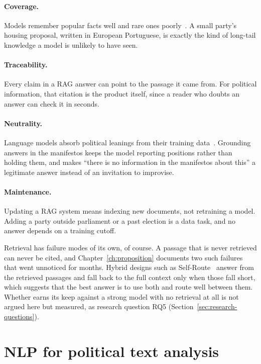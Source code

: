 \paragraph{Coverage.} Models remember popular facts well and rare ones poorly~\citep{kandpal2023largelanguagemodelsstruggle}. A small party's housing proposal, written in European Portuguese, is exactly the kind of long-tail knowledge a model is unlikely to have seen.

\paragraph{Traceability.} Every claim in a RAG answer can point to the passage it came from. For political information, that citation is the product itself, since a reader who doubts an answer can check it in seconds.

\paragraph{Neutrality.} Language models absorb political leanings from their training data~\citep{pretraining-political-bias}. Grounding answers in the manifestos keeps the model reporting positions rather than holding them, and makes ``there is no information in the manifestos about this'' a legitimate answer instead of an invitation to improvise.

\paragraph{Maintenance.} Updating a RAG system means indexing new documents, not retraining a model. Adding a party outside parliament or a past election is a data task, and no answer depends on a training cutoff.

Retrieval has failure modes of its own, of course. A passage that is never retrieved can never be cited, and Chapter~\ref{ch:proposition} documents two such failures that went unnoticed for months. Hybrid designs such as Self-Route~\citep{li2024ragorlongcontext} answer from the retrieved passages and fall back to the full context only when those fall short, which suggests that the best answer is to use both and route well between them. Whether \sysname{} earns its keep against a strong model with no retrieval at all is not argued here but measured, as research question RQ5 (Section~\ref{sec:research-questions}).

\section{NLP for political text analysis} \label{sec:sota-political}

